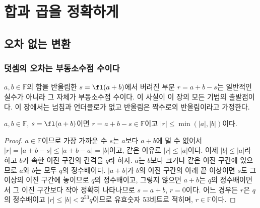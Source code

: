 \chapter{합과 곱을 정확하게}
\label{ch:exact-sums}


\section{오차 없는 변환}
\label{sec:eft}

\subsection{덧셈의 오차는 부동소수점 수이다}

$a,b\in\mathbb F$의 합을 반올림한 $s=\fl(a+b)$에서 버려진 부분 $r=a+b-s$는 일반적인 실수가 아니라 그 자체가 부동소수점 수이다. 이 사실이 이 장의 모든 기법의 출발점이다. 이 장에서는 넘침과 언더플로가 없고 반올림은 짝수로의 반올림이라고 가정한다.

\begin{lemma}
\label{lem:add-error}
$a,b\in\mathbb F$, $s=\fl(a+b)$이면 $r=a+b-s\in\mathbb F$이고 $|r|\le\min(|a|,|b|)$이다.
\end{lemma}

\begin{proof}
$a\in\mathbb F$이므로 가장 가까운 수 $s$는 $a$보다 $a+b$에 멀 수 없어서 $|r|=|a+b-s|\le|a+b-a|=|b|$이고, 같은 이유로 $|r|\le|a|$이다. 이제 $|b|\le|a|$라 하고 $b$가 속한 이진 구간의 간격을 $q$라 하자. $a$는 $b$보다 크거나 같은 이진 구간에 있으므로 $a$와 $b$는 모두 $q$의 정수배이다. $|a+b|$가 $b$의 이진 구간의 아래 끝 이상이면 $s$도 그 이상의 이진 구간에 놓이므로 $q$의 정수배이고, 그렇지 않으면 $a+b$는 $q$의 정수배이면서 그 이진 구간보다 작아 정확히 나타나므로 $s=a+b$, $r=0$이다. 어느 경우든 $r$은 $q$의 정수배이고 $|r|\le|b|<2^{53}q$이므로 유효숫자 $53$비트로 적히며, $r\in\mathbb F$이다.
\end{proof}

